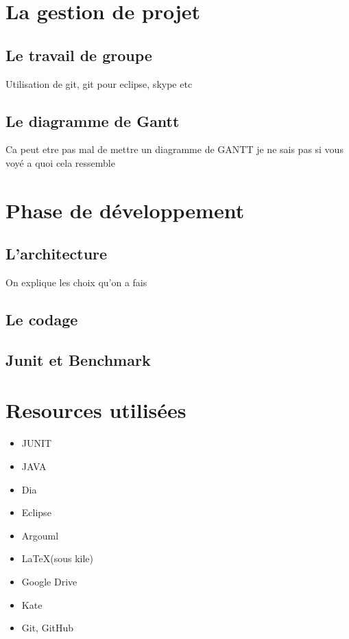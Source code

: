 \documentclass[a4paper,twoside,12pt]{report}
\begin{document}
\chapter{La gestion de projet}
%
\section{Le travail de groupe}
%
Utilisation de git, git pour eclipse, skype etc
\section{Le diagramme de Gantt}
%
Ca peut etre pas mal de mettre un diagramme de GANTT je ne sais pas si vous voyé a quoi cela ressemble
\chapter{Phase de développement}
%
\section{L'architecture}
On explique les choix qu'on a fais
\section{Le codage}
%
\section{Junit et Benchmark}

\newpage
{}


\chapter{Resources utilisées}
\begin{itemize}
 \item JUNIT
 \item JAVA
 \item Dia
 \item Eclipse
 \item Argouml
 \item \LaTeX (sous kile)
 \item Google Drive
 \item Kate
 \item Git, GitHub
\end{itemize}
\end{document}
